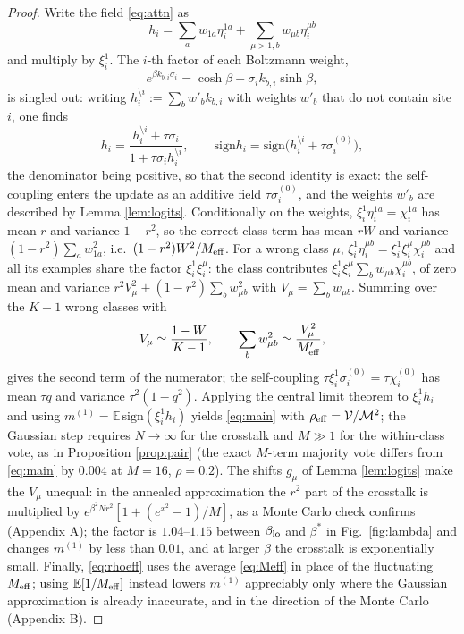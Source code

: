 \documentclass{SciPost}
\theoremstyle{plain}
\theoremstyle{definition}
\newcommand{\E}{\mathbb{E}}
\newcommand{\Meff}{M_{\rm eff}}
\newcommand{\sgn}{\mathrm{sign}}
\begin{document}
\begin{proof}
Write the field \eqref{eq:attn} as
\begin{equation*}
h_i=\sum_aw_{1a}\eta^{1a}_i+\sum_{\mu>1,b}w_{\mu b}\eta^{\mu b}_i
\end{equation*}
and multiply by $\xi^1_i$. The $i$-th factor of each Boltzmann weight,
\begin{equation*}
e^{\beta k_{b,i}\sigma_i}=\cosh\beta+\sigma_ik_{b,i}\sinh\beta,
\end{equation*}
is singled out: writing $h^{\setminus i}_i:=\sum_bw'_bk_{b,i}$ with weights $w'_b$ that do not contain site $i$, one finds
\begin{equation*}
h_i=\frac{h^{\setminus i}_i+\tau\sigma_i}{1+\tau\sigma_ih^{\setminus i}_i},\qquad \sgn h_i=\sgn\big(h^{\setminus i}_i+\tau\sigma^{(0)}_i\big),
\end{equation*}
the denominator being positive, so that the second identity is exact: the self-coupling enters the update as an additive field $\tau\sigma^{(0)}_i$, and the weights $w'_b$ are described by Lemma \ref{lem:logits}. Conditionally on the weights, $\xi^1_i\eta^{1a}_i=\chi^{1a}_i$ has mean $r$ and variance $1-r^2$, so the correct-class term has mean $rW$ and variance $(1-r^2)\sum_aw_{1a}^2$, i.e.\ $(1-r^2)W^2/\Meff$. For a wrong class $\mu$, $\xi^1_i\eta^{\mu b}_i=\xi^1_i\xi^\mu_i\chi^{\mu b}_i$ and all its examples share the factor $\xi^1_i\xi^\mu_i$: the class contributes $\xi^1_i\xi^\mu_i\sum_bw_{\mu b}\chi^{\mu b}_i$, of zero mean and variance $r^2V_\mu^2+(1-r^2)\sum_bw_{\mu b}^2$ with $V_\mu=\sum_bw_{\mu b}$. Summing over the $K-1$ wrong classes with
\begin{equation*}
V_\mu\simeq\frac{1-W}{K-1},\qquad \sum_bw_{\mu b}^2\simeq\frac{V_\mu^2}{\Meff'},
\end{equation*}
gives the second term of the numerator; the self-coupling $\tau\xi^1_i\sigma^{(0)}_i=\tau\chi^{(0)}_i$ has mean $\tau q$ and variance $\tau^2(1-q^2)$. Applying the central limit theorem to $\xi^1_ih_i$ and using $m^{(1)}=\E\,\sgn(\xi^1_ih_i)$ yields \eqref{eq:main} with $\rho_{\rm eff}=\mathcal V/\mathcal M^2$; the Gaussian step requires $N\to\infty$ for the crosstalk and $M\gg1$ for the within-class vote, as in Proposition \ref{prop:pair} (the exact $M$-term majority vote differs from \eqref{eq:main} by $0.004$ at $M=16$, $\rho=0.2$). The shifts $g_\mu$ of Lemma \ref{lem:logits} make the $V_\mu$ unequal: in the annealed approximation the $r^2$ part of the crosstalk is multiplied by $e^{\beta^2Nr^2}[1+(e^{x^2}-1)/M]$, as a Monte Carlo check confirms (Appendix A); the factor is $1.04$--$1.15$ between $\beta_{\rm lo}$ and $\beta^*$ in Fig.\ \ref{fig:lambda} and changes $m^{(1)}$ by less than $0.01$, and at larger $\beta$ the crosstalk is exponentially small. Finally, \eqref{eq:rhoeff} uses the average \eqref{eq:Meff} in place of the fluctuating $\Meff$; using $\E[1/\Meff]$ instead lowers $m^{(1)}$ appreciably only where the Gaussian approximation is already inaccurate, and in the direction of the Monte Carlo (Appendix B).
\end{proof}
\end{document}
